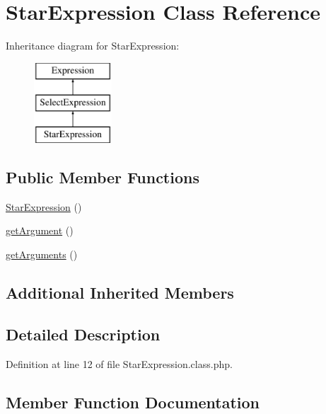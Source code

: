 \hypertarget{classStarExpression}{}\section{Star\+Expression Class Reference}
\label{classStarExpression}
Inheritance diagram for Star\+Expression\+:\begin{figure}[H]
\begin{center}
\leavevmode
\includegraphics[height=3.000000cm]{classStarExpression}
\end{center}
\end{figure}
\subsection*{Public Member Functions}
\begin{DoxyCompactItemize}
\item 
\hyperlink{classStarExpression_a7c9d934f3e104f7987f4266ef9e28eff}{Star\+Expression} ()
\item 
\hyperlink{classStarExpression_aea592d1760bbc7395f9e3e9b1f01b9a9}{get\+Argument} ()
\item 
\hyperlink{classStarExpression_ac356994bb75dacb90fd7ac6aa3dbb49c}{get\+Arguments} ()
\end{DoxyCompactItemize}
\subsection*{Additional Inherited Members}


\subsection{Detailed Description}


Definition at line 12 of file Star\+Expression.\+class.\+php.



\subsection{Member Function Documentation}
\mbox{\label{classStarExpression_aea592d1760bbc7395f9e3e9b1f01b9a9}} 
